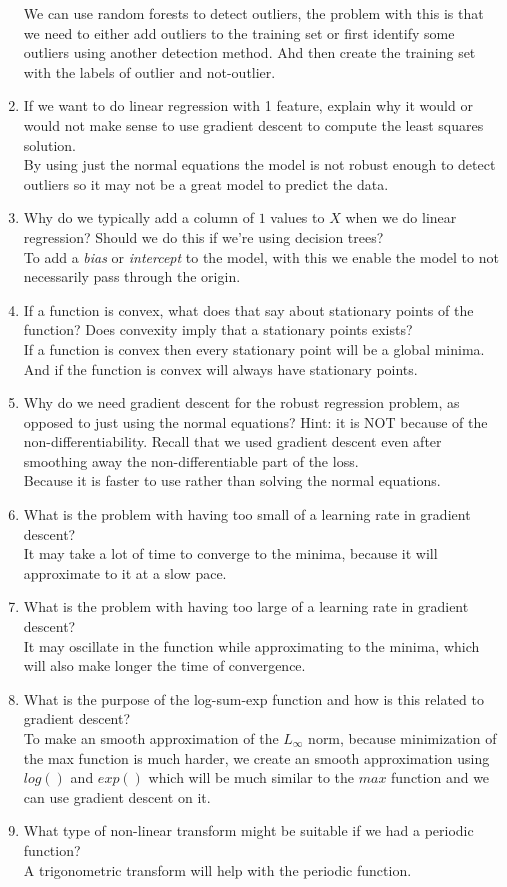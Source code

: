 \documentclass{article}
\def\ans#1{{\color{ans}#1}}
\begin{document}
\begin{enumerate}
\ans{
    We can use random forests to detect outliers, the problem with this is that we need to either 
    add outliers to the training set or first identify some outliers using another detection method. 
    Ahd then create the training set with the labels of outlier and not-outlier.
}
\item If we want to do linear regression with 1 feature, explain why it would or would not make sense to use gradient descent to compute the least squares solution.\\
\ans{
    By using just the normal equations the model is not robust enough to detect outliers so it may 
    not be a great model to predict the data.
}
\item Why do we typically add a column of $1$ values to $X$ when we do linear regression? Should we do this if we're using decision trees?\\
\ans{
    To add a \emph{bias} or \emph{intercept} to the model, with this we enable the model to not 
    necessarily pass through the origin.
}
\item If a function is convex, what does that say about stationary points of the function? Does convexity imply that a stationary points exists?\\
\ans{
    If a function is convex then every stationary point will be a global minima. And if the function is 
    convex will always have stationary points.
}
\item Why do we need gradient descent for the robust regression problem, as opposed to just using the normal equations? Hint: it is NOT because of the non-differentiability. Recall that we used gradient descent even after smoothing away the non-differentiable part of the loss.\\
\ans{
    Because it is faster to use rather than solving the normal equations.
}
\item What is the problem with having too small of a learning rate in gradient descent?\\
\ans{
    It may take a lot of time to converge to the minima, because it will approximate to it at a 
    slow pace.
}
\item What is the problem with having too large of a learning rate in gradient descent?\\
\ans{
    It may oscillate in the function while approximating to the minima, which will also make longer 
    the time of convergence.
}
\item What is the purpose of the log-sum-exp function and how is this related to gradient descent?\\
\ans{
    To make an smooth approximation of the $L_\infty$ norm, because minimization of the max function is 
    much harder, we create an smooth approximation using $log()$ and $exp()$ which will be much similar 
    to the $max$ function and we can use gradient descent on it.
}
\item What type of non-linear transform might be suitable if we had a periodic function?\\
\ans{
    A trigonometric transform will help with the periodic function.
}
\end{enumerate}
\end{document}
